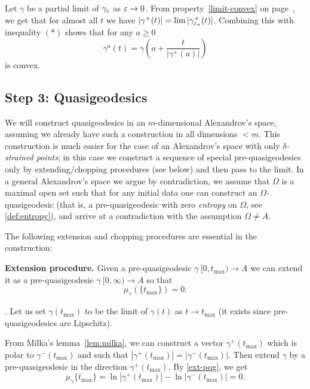 \documentclass{article}
\begin{document}
Let $\gamma$ be a partial limit of $\gamma_{\varepsilon}$ as $\varepsilon\to0$.
From property~\ref{limit-convex} on page~\pageref{limit-convex}, we get that for
almost all $t$ we have $|\gamma^+(t)|=\lim|\gamma_{\varepsilon_n}^+(t)|$.
Combining this with inequality $(*)$ shows that for any $a\ge0$
$$\gamma^{a}(t)=\gamma\left({a}+\frac{t}{|\gamma^+({a})|}\right)$$
is convex.
\qeds






\subsection{Step 3: Quasigeodesics}\label{step3}


We will construct quasigeodesics in an $m$-dimensional Alexandrov's space, assuming
we already have such a construction in all dimensions $<m$. 
This construction is much easier for the case of an Alexandrov's space with only
\textit{$\delta$-strained points}; in this case we construct a sequence of special pre-quasigeodesics only by
extending/chopping procedures (see below) and then pass to the limit.
In a general Alexandrov's space we argue by contradiction, we assume that $\Omega$ is a maximal
open set such that for any initial data one can construct an
$\Omega$-quasigeodesic 
(that is, a pre-quasigeodesic with zero {\it entropy} on
$\Omega$, see \ref{def:entropy}), 
and arrive at a contradiction with the assumption
$\Omega\not=A$.





The following extension and chopping procedures are essential in the construction:

\begin{thm}{\bf Extension procedure.}\label{extension} Given a pre-quasigeodesic
$\gamma\:[0,t_{\max})\to A$ we can extend it as a pre-quasigeodesic
$\gamma\:[0,\infty)\to A$ so that 
$$\mu_\gamma(\{t_{\max}\})=0.$$
\end{thm}
\Proof. 
Let us set $\gamma(t_{\max})$ to be the limit of $\gamma(t)$ as $t\to t_{\max}$
(it exists since pre-quasigeodesics are Lipschitz).

From Milka's lemma~\ref{lem:milka}, we can construct a vector 
$\gamma^+(t_{\max})$ which is polar to $\gamma^-(t_{\max})$
and such that
$|\gamma^+(t_{\max})|=|\gamma^-(t_{\max})|$.
Then extend $\gamma$ by a pre-quasigeodesic in the direction $\gamma^+(t_{\max})$. 
By \ref{ext-pqg}, we get
$$\mu_\gamma\{t_{\max}\}=\ln|\gamma^+(t_{\max})|-\ln|\gamma^-(t_{\max}
)|=0.$$
\qedsf
\end{document}
